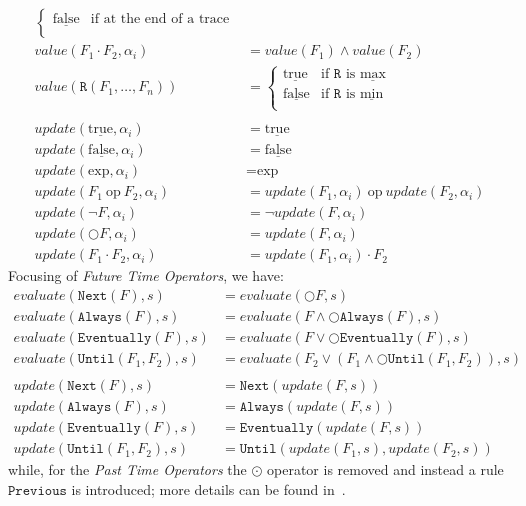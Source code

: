 \documentclass[english]{article}
\begin{document}
{\begin{align*}
\begin{cases}
            \underline{\text{false}} & \text{if at the end of a trace} \\
        \end{cases}\\
        value(F_1 \cdot F_2,\alpha_i) & = value(F_1)\land value(F_2) \\ 
        value(\mathtt{R}(F_1,\ldots,F_n)) & =
        \begin{cases}
            \underline{\text{true}} & \text{if }\mathtt{R}\text{ is } \underline{\text{max}}\\
            \underline{\text{false}} & \text{if }\mathtt{R}\text{ is } \underline{\text{min}}\\
        \end{cases}\\ \\
        update(\underline{\text{true}},\alpha_i) & = \underline{\text{true}} \\
        update(\underline{\text{false}},\alpha_i) & = \underline{\text{false}} \\ 
        update(\text{exp},\alpha_i) & = \text{exp}\\
        update(F_1\ \text{op}\ F_2,\alpha_i) & = update(F_1,\alpha_i)\ \text{op}\ update(F_2,\alpha_i) \\
        update(\neg{F},\alpha_i) & = \neg{update(F,\alpha_i)}  \\
        update(\bigcirc F,\alpha_i) & = update(F,\alpha_i)  \\
        update(F_1 \cdot F_2,\alpha_i) & = update(F_1,\alpha_i)\cdot F_2
    \end{align*}
    }
Focusing of \textit{Future Time Operators}, we have:
\begin{align*}
    evaluate(\mathtt{Next}(F),s)&=evaluate(\bigcirc F,s) \\
    evaluate(\mathtt{Always}(F),s)&=evaluate(F\land\bigcirc\mathtt{Always}(F),s) \\
    evaluate(\mathtt{Eventually}(F),s)&=evaluate(F\lor\bigcirc\mathtt{Eventually}(F),s) \\
    evaluate(\mathtt{Until}(F_1,F_2),s)&=evaluate(F_2\lor(F_1\land\bigcirc\mathtt{Until}(F_1,F_2)),s) \\ \\
    update(\mathtt{Next}(F),s)&=\mathtt{Next}(update(F,s)) \\
    update(\mathtt{Always}(F),s)&=\mathtt{Always}(update(F,s)) \\
    update(\mathtt{Eventually}(F),s)&=\mathtt{Eventually}(update(F,s)) \\
    update(\mathtt{Until}(F_1,F_2),s)&=\mathtt{Until}(update(F_1,s),update(F_2,s))
\end{align*}
while, for the \textit{Past Time Operators} the $\odot$ operator is removed and instead a rule $\mathtt{Previous}$ is introduced; more details can be found in~\cite{barringer2004program}.
\end{document}
